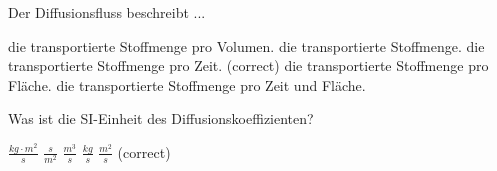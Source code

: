 \documentclass[11pt]{exam}
\begin{document}
\begin{questions}
\vspace{3mm}\question Der Diffusionsfluss beschreibt ...

\begin{choices}
	\choice die transportierte Stoffmenge pro Volumen.
	\choice die transportierte Stoffmenge.
	\choice die transportierte Stoffmenge pro Zeit. (correct)
	\choice die transportierte Stoffmenge pro Fläche.
	\choice die transportierte Stoffmenge pro Zeit und Fläche.
\end{choices}

\vspace{3mm}\question Was ist die SI-Einheit des Diffusionskoeffizienten?

\begin{choices}
	\choice \( \frac{kg \cdot m^2}{s} \)
	\choice \( \frac{s}{m^2} \)
	\choice \( \frac{m^3}{s} \)
	\choice \( \frac{kg}{s} \)
	\choice \( \frac{m^2}{s} \) (correct)
\end{choices}

\vspace{3mm}\end{questions}
\end{document}
